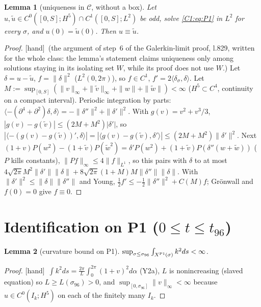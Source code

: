 \documentclass[11pt]{article}
\newtheorem{lemma}{Lemma}[section]\newtheorem{proposition}[lemma]{Proposition}\newtheorem{theorem}[lemma]{Theorem}\newtheorem{remark}[lemma]{Remark}
\newcommand{\fn}[1]{\texttt{\detokenize{#1}}}
\newcommand{\tH}{\textup{[hand]}}\newcommand{\tS}{\textup{[sym]}}\newcommand{\tC}{\textup{[cert]}}\newcommand{\tI}{\textup{[cited]}}\newcommand{\tN}{\textup{[num]}}\newcommand{\tL}{\textup{[Lean]}}
\newcommand{\ip}[2]{\langle#1,#2\rangle}
\begin{document}
\begin{lemma}[uniqueness in $\mathcal C$, without a box]\label{C1:lem:uniq}
Let $u,\tilde u\in C^0([0,S];H^5)\cap C^1([0,S];L^2)$ be odd, solve \eqref{C1:eq:P1} in $L^2$ for every $\sigma$, and $u(0)=\tilde u(0)$. Then $u\equiv\tilde u$.
\end{lemma}
\begin{proof}\tH\ (the argument of step~6 of the Galerkin-limit proof, \fn{step4_proof.tex} l.829, written for the whole class: the lemma's statement claims uniqueness only among solutions staying in its isolating set $W$, while its proof does not use $W$.) Let $\delta=u-\tilde u$, $f=\|\delta\|^2$ ($L^2(0,2\pi)$), so $f\in C^1$, $f'=2\ip{\delta_\sigma}{\delta}$. Let $M:=\sup_{[0,S]}(\|v\|_\infty+\|\tilde v\|_\infty+\|w\|+\|\tilde w\|)<\infty$ ($H^5\subset C^4$, continuity on a compact interval). Periodic integration by parts: $\ip{-(\partial^4+\partial^2)\delta}{\delta}=-\|\delta''\|^2+\|\delta'\|^2$. With $g(v)=v^2+v^3/3$, $|g(v)-g(\tilde v)|\le(2M+M^2)|\delta'|$, so $|\ip{-(g(v)-g(\tilde v))'}{\delta}|=|\ip{g(v)-g(\tilde v)}{\delta'}|\le(2M+M^2)\|\delta'\|^2$. Next $(1+v)P(w^2)-(1+\tilde v)P(\tilde w^2)=\delta'P(w^2)+(1+\tilde v)P(\delta''(w+\tilde w))$ ($P$ kills constants), $\|Pf\|_\infty\le4\|f\|_{L^1}$, so this pairs with $\delta$ to at most $4\sqrt{2\pi}M^2\|\delta'\|\|\delta\|+8\sqrt{2\pi}(1+M)M\|\delta''\|\|\delta\|$. With $\|\delta'\|^2\le\|\delta\|\|\delta''\|$ and Young, $\frac12f'\le-\frac12\|\delta''\|^2+C(M)f$; Gr\"onwall and $f(0)=0$ give $f\equiv0$.
\end{proof}

\section{Identification on P1 ($0\le t\le t_{96}$)}
\begin{lemma}[curvature bound on P1]\label{C1:lem:kP1}
$\sup_{\sigma\le\sigma_{96}}\int_{X^{\rm P1}(\sigma)}k^2ds<\infty$.
\end{lemma}
\begin{proof}\tH\ $\int k^2ds=\frac{2\pi}L\int_0^{2\pi}(1+v)^2d\alpha$ (Y2a), $L$ is nonincreasing (slaved equation) so $L\ge L(\sigma_{96})>0$, and $\sup_{[0,\sigma_{96}]}\|v\|_\infty<\infty$ because $u\in C^0(I_k;H^5)$ on each of the finitely many $I_k$.
\end{proof}
\end{document}
